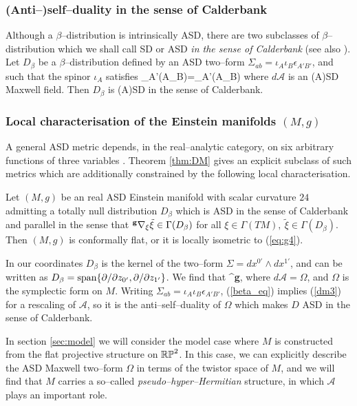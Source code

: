 \subsubsection{(Anti--)self--duality in the sense of Calderbank}
Although a $\beta$--distribution is intrinsically ASD, there are two subclasses of $\beta$--distribution which we shall call SD or ASD \textit{in the sense of Calderbank} \cite{Cal1} (see also \cite{West}). Let $D_\beta$ be a $\beta$--distribution defined by an ASD two--form $\Sigma_{ab}=\iota_A\iota_B\epsilon_{A'B'}$, and  such that the spinor $\iota_A$ satisfies
\be
\label{dm3}
\nabla_{A'(A}\iota_{B)}=_{A'(A}\iota_{B)}
\ee
where $d\mathcal{A}$ is an (A)SD Maxwell field. Then $D_\beta$ is (A)SD in the sense of Calderbank.

 
\subsubsection{Local characterisation of the Einstein manifolds $(M,g)$}

A general ASD metric depends, in the real--analytic category, on six arbitrary functions of three variables \cite{DFK}. Theorem \ref{thm:DM} gives an explicit subclass of such metrics which are additionally constrained by the following local characterisation.

\begin{theo}[\cite{DM}] \label{thm:DMcharacterisation}
Let $(M,g)$ be an real ASD Einstein manifold with scalar curvature $24$ admitting a totally null distribution $D_\beta$ which is ASD in the sense of Calderbank and parallel in the sense that $^{\bf g}\nabla_{\xi} \tilde{\xi}\in\Gamma(D_\beta)$ for all $\xi\in \Gamma(TM),\ \tilde{\xi}\in\Gamma(D_\beta)$. Then $(M,g)$ is conformally flat, or it is locally isometric to (\ref{eq:g4}).
\end{theo}
\noindent

In our coordinates $D_\beta$ is the kernel of the two--form $\Sigma=dx^{0'}\wedge dx^{1'}$, and can be written as ${D_\beta}=\mathrm{span}\{\partial/\partial z_{0'},\partial/\partial z_{1'}\}$. We find that
\be
\label{beta_eq}
^{\bf g}\nabla{}\otimes \Sigma,
\ee
where $d\mathcal{A}=\Omega$, and $\Omega$ is the symplectic form on $M$. Writing $\Sigma_{ab}=\iota_A\iota_B\epsilon_{A'B'}$, (\ref{beta_eq}) implies (\ref{dm3}) for a rescaling of $\mathcal{A}$, so it is the anti--self--duality of $\Omega$ which makes $D$ ASD in the sense of Calderbank.

In section \ref{sec:model} we will consider the model case where $M$ is constructed from the flat projective structure on $\mathbb{RP}^2$. In this case, we can explicitly describe the ASD Maxwell two--form $\Omega$ in terms of the twistor space of $M$,
and we will find that $M$ carries a so--called \textit{pseudo--hyper--Hermitian} structure, in which $\mathcal{A}$ plays an important role.












